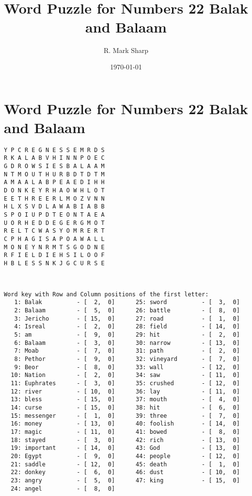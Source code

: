 \documentclass[12pt,a4paper,article]{memoir}\usepackage[]{graphicx}\usepackage[]{color}
\title{Word Puzzle for Numbers 22 Balak and Balaam}
\subtitle{}
\author{R. Mark Sharp}
\date{\today}
\begin{document}
\maketitle






\clearpage
\Large
\section*{Word Puzzle for Numbers 22 Balak and Balaam}
\begin{verbatim}
Y P C R E G N E S S E M R D S 
R K A L A B V H I N N P O E C 
G D R O W S I E S B A L A A M 
N T M O U T H U R B D T D T M 
A M A A L A B P E A E D I H H 
D O N K E Y R H A O W H L O T 
E E T H R E E R L M O Z V N N 
H L X S V D L A W A B I A B B 
S P O I U P D T E O N T A E A 
U O R H E D D E G E R G M O T 
R E L T C W A S Y O M R E R T 
C P H A G I S A P O A W A L L 
M O N E Y N R M T S G O D N E 
R F I E L D I E H S I L O O F 
H B L E S S N K J G C U R S E 

\end{verbatim}
\clearpage
\normalsize
\begin{verbatim}


Word key with Row and Column positions of the first letter:
   1: Balak          - [  2,  0]      25: sword          - [  3,  0]
   2: Balaam         - [  5,  0]      26: battle         - [  8,  0]
   3: Jericho        - [ 15,  0]      27: road           - [  1,  0]
   4: Isreal         - [  2,  0]      28: field          - [ 14,  0]
   5: am             - [  9,  0]      29: hit            - [  2,  0]
   6: Balaam         - [  3,  0]      30: narrow         - [ 13,  0]
   7: Moab           - [  7,  0]      31: path           - [  2,  0]
   8: Pethor         - [  9,  0]      32: vineyard       - [  7,  0]
   9: Beor           - [  8,  0]      33: wall           - [ 12,  0]
  10: Nation         - [  2,  0]      34: saw            - [ 11,  0]
  11: Euphrates      - [  3,  0]      35: crushed        - [ 12,  0]
  12: river          - [ 10,  0]      36: lay            - [ 11,  0]
  13: bless          - [ 15,  0]      37: mouth          - [  4,  0]
  14: curse          - [ 15,  0]      38: hit            - [  6,  0]
  15: messenger      - [  1,  0]      39: three          - [  7,  0]
  16: money          - [ 13,  0]      40: foolish        - [ 14,  0]
  17: magic          - [ 11,  0]      41: bowed          - [  8,  0]
  18: stayed         - [  3,  0]      42: rich           - [ 13,  0]
  19: important      - [ 14,  0]      43: God            - [ 13,  0]
  20: Egypt          - [  9,  0]      44: people         - [ 12,  0]
  21: saddle         - [ 12,  0]      45: death          - [  1,  0]
  22: donkey         - [  6,  0]      46: dust           - [ 10,  0]
  23: angry          - [  5,  0]      47: king           - [ 15,  0]
  24: angel          - [  8,  0]

\end{verbatim}
\end{document}
